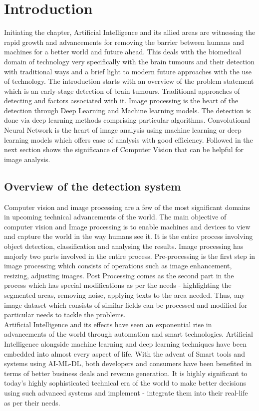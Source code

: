 \chapter{Introduction}
Initiating the chapter, Artificial Intelligence and its allied areas are witnessing the rapid growth and advancements for removing the barrier between humans and machines for a better world and future ahead. This deals with the biomedical domain of technology very specifically with the brain tumours and their detection with traditional ways and a brief light to modern future approaches with the use of technology. The introduction starts with an overview of the problem statement which is an early-stage detection of brain tumours. Traditional approaches of detecting and factors associated with it. Image processing is the heart of the detection through Deep Learning and Machine learning models. The detection is done via deep learning methods comprising particular algorithms. Convolutional Neural Network is the heart of image analysis using machine learning or deep learning models which offers ease of analysis with good efficiency. Followed in the next section shows the significance of Computer Vision that can be helpful for image analysis. 
\section{Overview of the detection system}

{Computer vision and image processing are a few of the most significant domains in upcoming technical advancements of the world. The main objective of computer vision and Image processing is to enable machines and devices to view and capture the world in the way humans see it. It is the entire process involving object detection, classification and analysing the results. Image processing has majorly two parts involved in the entire process. Pre-processing is the first step in image processing which consists of operations such as image enhancement, resizing, adjusting images. Post Processing comes as the second part in the process which has special modifications as per the needs - highlighting the segmented areas, removing noise, applying texts to the area needed. Thus, any image dataset which consists of similar fields can be processed and modified for particular needs to tackle the problems.}\\

{Artificial Intelligence and its effects have seen an exponential rise in advancements of the world through automation and smart technologies. Artificial Intelligence alongside machine learning and deep learning techniques have been embedded into almost every aspect of life. With the advent of Smart tools and systems using AI-ML-DL, both developers and consumers have been benefited in terms of better business deals and revenue generation. It is highly significant to today's highly sophisticated technical era of the world to make better decisions using such advanced systems and implement - integrate them into their real-life as per their needs.}\\

